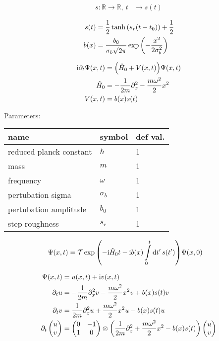 \documentclass[a4paper,10pt]{article}
\newcommand{\mi}{\mathrm{i}}
\newcommand{\intl}{\int\limits}
\begin{document}
\begin{align}
    s:\mathbb{R}\to\mathbb{R},~
    t
    &\to
    s(t)
\end{align}

\begin{align}
	s(t)
	&=
	\frac{1}{2}\tanh\pqty{s_r(t-t_0)}
	+\frac{1}{2}
\\
	b(x)
	&=
	\frac{b_0}{\sigma_b\sqrt{2\pi}}
	\exp\pqty{-\frac{x^2}{2\sigma_b^2}}
\end{align}

\begin{align}
    \mi
    \partial_t
    \Psi
    (x,t)
    &=
    \pqty{
    		\hat{H}_0
        +
        V(x,t)
    }
    \Psi
    (x,t)
\\
	\hat{H}_0
	&=
    -\frac{1}{2m}
    \partial_x^2
    -
    \frac{m\omega^2}{2}
    x^2
\\
    V(x,t)
    &=
    b(x)
    s(t)
\end{align}


Parameters:

\begin{tabular}{lll}
name&symbol&def val.\\
\hline
reduced planck constant&$\hbar$&1\\
mass&$m$&1\\
frequency&$\omega$&1\\
pertubation sigma&$\sigma_b$&1\\
pertubation amplitude&$b_0$&1\\
step roughness&$s_r$&1\
\end{tabular}





\begin{align}
    \Psi
    (x,t)
    &=
    \mathcal{T}
    \exp\pqty{
    		-
    		\mi
    		\hat{H}_0
    		t
    		-
		\mi b(x)
		\intl_0^t
		\dd{t^\prime}
		s(t^\prime)    
    }
    \Psi
    (x,0)
\end{align}



\begin{align}
	\Psi
	(x,t)
	&=
	u(x,t)
	+
	\mi v(x,t)
\\
	\partial_t u
	&=
	-
	\frac{1}{2m}
	\partial_x^2
	v
	-
	\frac{m\omega^2}{2}
	x^2
	v
	+
	b(x)
	s(t)
	v
\\
	\partial_t v
	&=
	\frac{1}{2m}
	\partial_x^2
	u
	+
	\frac{m\omega^2}{2}
	x^2
	u
	-
	b(x)
	s(t)
	u
\\
	\partial_t
	\pmqty{u\\v}
	&=
	\pmqty{0&-1\\1&0}	
	\otimes	
	\pqty{
	\frac{1}{2m}
	\partial_x^2
	+
	\frac{m\omega^2}{2}
	x^2
	-
	b(x)
	s(t)
	}
	\pmqty{u\\v}
\end{align}
\end{document}
